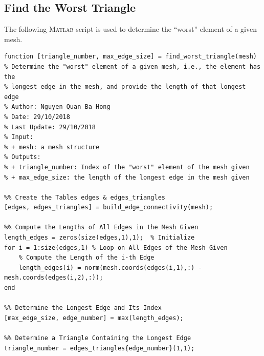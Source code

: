 \documentclass[11pt,a4paper,center,notitlepage]{article}
\numberwithin{equation}{section}
\begin{document}
\subsection{Find the Worst Triangle}
The following \textsc{Matlab} script is used to determine the ``worst'' element of a given mesh.
\begin{verbatim}
function [triangle_number, max_edge_size] = find_worst_triangle(mesh)
% Determine the "worst" element of a given mesh, i.e., the element has the 
% longest edge in the mesh, and provide the length of that longest edge
% Author: Nguyen Quan Ba Hong
% Date: 29/10/2018
% Last Update: 29/10/2018
% Input:
% + mesh: a mesh structure
% Outputs:
% + triangle_number: Index of the "worst" element of the mesh given
% + max_edge_size: the length of the longest edge in the mesh given

%% Create the Tables edges & edges_triangles
[edges, edges_triangles] = build_edge_connectivity(mesh);

%% Compute the Lengths of All Edges in the Mesh Given
length_edges = zeros(size(edges,1),1);  % Initialize
for i = 1:size(edges,1) % Loop on All Edges of the Mesh Given
    % Compute the Length of the i-th Edge
    length_edges(i) = norm(mesh.coords(edges(i,1),:) - mesh.coords(edges(i,2),:));
end

%% Determine the Longest Edge and Its Index
[max_edge_size, edge_number] = max(length_edges);

%% Determine a Triangle Containing the Longest Edge
triangle_number = edges_triangles{edge_number}(1,1);
\end{verbatim}
\end{document}
